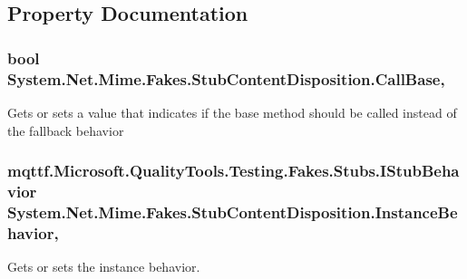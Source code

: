 \subsection{Property Documentation}
\hypertarget{class_system_1_1_net_1_1_mime_1_1_fakes_1_1_stub_content_disposition_af8f3333b242887cb5b2ac461f4f6b25b}{
\subsubsection[{Call\-Base}]{\setlength{\rightskip}{0pt plus 5cm}bool System.\-Net.\-Mime.\-Fakes.\-Stub\-Content\-Disposition.\-Call\-Base\hspace{0.3cm}{\ttfamily [get]}, {\ttfamily [set]}}}\label{class_system_1_1_net_1_1_mime_1_1_fakes_1_1_stub_content_disposition_af8f3333b242887cb5b2ac461f4f6b25b}


Gets or sets a value that indicates if the base method should be called instead of the fallback behavior

\hypertarget{class_system_1_1_net_1_1_mime_1_1_fakes_1_1_stub_content_disposition_a9e26496a00dabbc0d6ddb45c1bd305c2}{
\subsubsection[{Instance\-Behavior}]{\setlength{\rightskip}{0pt plus 5cm}mqttf.\-Microsoft.\-Quality\-Tools.\-Testing.\-Fakes.\-Stubs.\-I\-Stub\-Behavior System.\-Net.\-Mime.\-Fakes.\-Stub\-Content\-Disposition.\-Instance\-Behavior\hspace{0.3cm}{\ttfamily [get]}, {\ttfamily [set]}}}\label{class_system_1_1_net_1_1_mime_1_1_fakes_1_1_stub_content_disposition_a9e26496a00dabbc0d6ddb45c1bd305c2}


Gets or sets the instance behavior.

